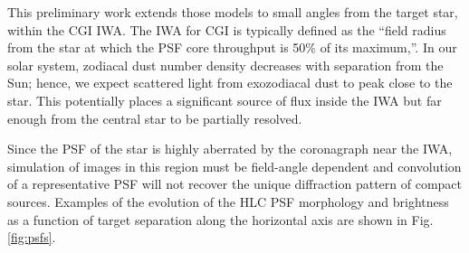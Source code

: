 \documentclass[]{spie}  %
\begin{document}
This preliminary work extends those models to small angles from the target star, within the \gls{CGI} \gls{IWA}.
The \gls{IWA} for CGI is typically defined as the ``field radius from the star at which the \gls{PSF} core throughput is 50\% of its maximum,''\cite{krist_numerical_2015}.
In our solar system, zodiacal dust number density decreases with separation from the Sun\cite{rowan-robinson_improved_2013,kennedy_exo-zodi_2014}; hence, we expect scattered light from exozodiacal dust to peak close to the star. This potentially places a significant source of flux inside the \gls{IWA} but far enough from the central star to be partially resolved.

Since the \gls{PSF} of the star is highly aberrated by the coronagraph near the \gls{IWA}, simulation of images in this region must be field-angle dependent and  convolution of a representative \gls{PSF} will not recover the unique diffraction pattern of compact sources. 
Examples of the evolution of the \gls{HLC} PSF morphology and brightness as a function of target separation along the horizontal axis are shown in Fig. \ref{fig:psfs}.
\end{document}
